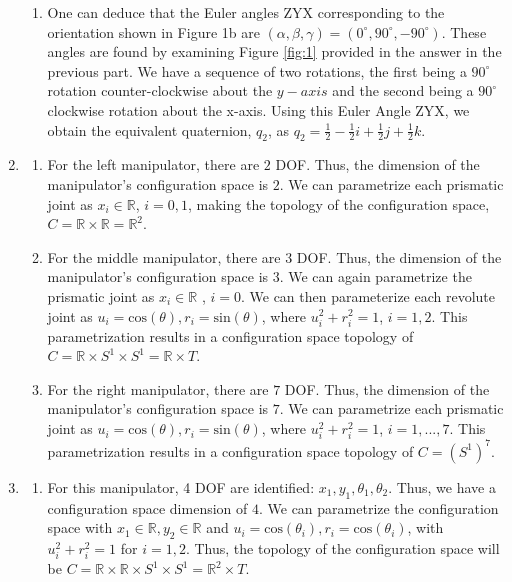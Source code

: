 \documentclass[11pt]{article}
\begin{document}
\begin{enumerate}[leftmargin=0.3in]
\begin{enumerate}
       \item One can deduce that the Euler angles ZYX corresponding to the orientation shown in Figure 1b are $(\alpha, \beta, \gamma) = (0 ^\circ, 90 ^\circ, -90 ^\circ)$. These angles are found by examining Figure \ref{fig:1} provided in the answer in the previous part. We have a sequence of two rotations, the first being a $90 ^\circ$ rotation counter-clockwise about the $y-axis$ and the second being a $90 ^\circ$ clockwise rotation about the x-axis. Using this Euler Angle ZYX, we obtain the equivalent quaternion, $\mathit{q}_2$, as $\mathit{q}_2 = \frac{1}{2} - \frac{1}{2}i + \frac{1}{2}j + \frac{1}{2}k$. 

   \end{enumerate} %

\item %

    \begin{enumerate}
        \item For the left manipulator, there are $2$ DOF. Thus, the dimension of the manipulator's configuration space is $2$. We can parametrize each prismatic joint as $x_i \in \mathbb{R}$, $i = 0,1$, making the topology of the configuration space, $C = \mathbb{R} \times \mathbb{R} = \mathbb{R}^2$. 

        \item For the middle manipulator, there are $3$ DOF. Thus, the dimension of the manipulator's configuration space is $3$. We can again parametrize the prismatic joint as $x_i \in \mathbb{R}$ , $i = 0$. We can then parameterize each revolute joint as $u_i = \text{cos}(\theta) , r_i = \text{sin}(\theta)$, where $u_i^2 + r_i^2 = 1$, $i = 1, 2$. This parametrization results in a configuration space topology of $C = \mathbb{R} \times S^1 \times S^1 = \mathbb{R} \times T$.

\item For the right manipulator, there are $7$ DOF. Thus, the dimension of the manipulator's configuration space is $7$. We can parametrize each prismatic joint as $u_i = \text{cos}(\theta) , r_i = \text{sin}(\theta)$, where $u_i^2 + r_i^2 = 1$, $i = 1, ..., 7$. This parametrization results in a configuration space topology of $C = (S^1)^7$. 

    \end{enumerate}

\item %

    \begin{enumerate}
        \item For this manipulator, 4 DOF are identified: $x_1, y_1, \theta_1, \theta_2$. Thus, we have a configuration space dimension of $4$. We can parametrize the configuration space with $x_1 \in \mathbb{R}, y_2 \in \mathbb{R}$ and $u_i = \text{cos}(\theta_i), r_i = \text{cos}(\theta_i)$, with $u_i^2 + r_i^2 = 1$ for $i = 1, 2$. Thus, the topology of the configuration space will be $C = \mathbb{R} \times \mathbb{R} \times S^1 \times S^1 = \mathbb{R}^2 \times T$. 


\end{enumerate}
\end{enumerate}
\end{document}
